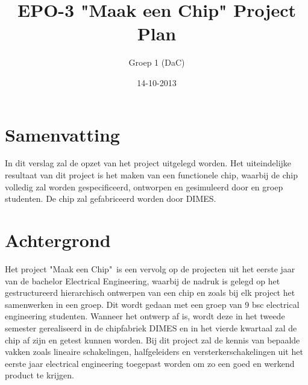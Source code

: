 \documentclass{scrartcl}
\author{Groep 1 (DaC)}
\title{EPO-3 "Maak een Chip" Project Plan}
\date{14-10-2013}
\begin{document}
\maketitle
\vspace{80 mm}
\section*{Samenvatting}
In dit verslag zal de opzet van het project uitgelegd worden. Het uiteindelijke resultaat van dit project is het maken van een functionele chip, waarbij de chip volledig zal worden gespecificeerd, ontworpen en gesimuleerd door en groep studenten. De chip zal gefabriceerd worden door DIMES. 
\newpage
\setlength{\cftbeforetoctitleskip}{-3em}

\tableofcontents
\newpage
{}
\section{Achtergrond}
Het project "Maak een Chip"\ is een vervolg op de projecten uit het eerste jaar van de bachelor Electrical Engineering, waarbij de nadruk is gelegd op het gestructureerd hierarchisch ontwerpen van een chip en zoals bij elk project het samenwerken in een groep. Dit wordt gedaan met een groep van 9 bsc electrical engineering studenten. Wanneer het ontwerp af is, wordt deze in het tweede semester gerealiseerd in de chipfabriek DIMES en in het vierde kwartaal zal de chip af zijn en getest kunnen worden. Bij dit project zal de kennis van bepaalde vakken zoals lineaire schakelingen, halfgeleiders en versterkerschakelingen uit het eerste jaar electrical engineering toegepast worden om zo een goed en werkend product te krijgen.
\end{document}
